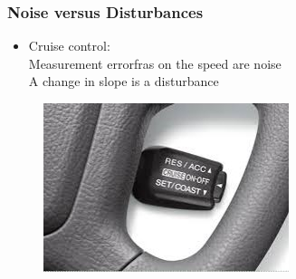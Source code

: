 \begin{frame}
	\frametitle{Noise versus Disturbances}
	\begin{itemize}
		\item Cruise control: \\
		Measurement errorfra{}s on the speed are noise \\
		A change in slope is a disturbance
	\end{itemize}
	\begin{figure}
\centering
\includegraphics[width=0.7\linewidth]{"cruise control"}
\caption{}
\label{fig:cruisecontrol}
\end{figure}

\end{frame}

